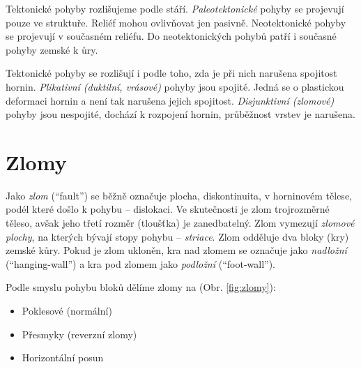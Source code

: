 Tektonické pohyby rozlišujeme podle stáří. \emph{Paleotektonické} pohyby se projevují pouze ve struktuře. Reliéf mohou ovlivňovat jen pasivně. {Neotektonické} pohyby se projevují v současném reliéfu. Do neotektonických pohybů patří i současné pohyby zemské k ůry.

Tektonické pohyby se rozlišují i podle toho, zda je při nich narušena spojitost hornin. \emph{Plikativní (duktilní, vrásové)} pohyby jsou spojité. Jedná se o plastickou deformaci hornin a není tak narušena jejich spojitost. \emph{Disjunktivní (zlomové)} pohyby jsou nespojité, dochází k rozpojení hornin, průběžnost vrstev je narušena.

\section{Zlomy}
Jako \emph{zlom} (\enquote{fault}) se běžně označuje plocha, diskontinuita, v horninovém tělese, podél které došlo k pohybu -- dislokaci. Ve skutečnosti je zlom trojrozměrné těleso, avšak jeho třetí rozměr (tloušťka) je zanedbatelný. Zlom vymezují \emph{zlomové plochy}, na kterých bývají stopy pohybu -- \emph{striace}. Zlom odděluje dva bloky (kry) zemské kůry. Pokud je zlom ukloněn, kra nad zlomem se označuje jako \emph{nadložní} (\enquote{hanging-wall}) a kra pod zlomem jako \emph{podložní} (\enquote{foot-wall}).

Podle smyslu pohybu bloků dělíme zlomy na (Obr. \ref{fig:zlomy}):
\begin{itemize}
	\item Poklesové (normální)
	\item Přesmyky (reverzní zlomy)
	\item Horizontální posun
\end{itemize}

